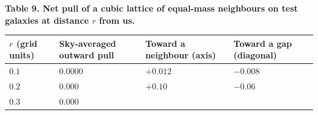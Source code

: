 \documentclass[
  11pt,
]{article}
\begin{document}
\textbf{Table 9. Net pull of a cubic lattice of equal-mass neighbours on
test galaxies at distance \(r\) from us.}

\begin{longtable}[]{@{}llll@{}}
\toprule
\begin{minipage}[b]{0.22\columnwidth}\raggedright
\(r\) (grid units)\strut
\end{minipage} & \begin{minipage}[b]{0.22\columnwidth}\raggedright
Sky-averaged outward pull\strut
\end{minipage} & \begin{minipage}[b]{0.22\columnwidth}\raggedright
Toward a neighbour (axis)\strut
\end{minipage} & \begin{minipage}[b]{0.22\columnwidth}\raggedright
Toward a gap (diagonal)\strut
\end{minipage}\tabularnewline
\midrule
\endhead
\begin{minipage}[t]{0.22\columnwidth}\raggedright
\(0.1\)\strut
\end{minipage} & \begin{minipage}[t]{0.22\columnwidth}\raggedright
\(0.0000\)\strut
\end{minipage} & \begin{minipage}[t]{0.22\columnwidth}\raggedright
\(+0.012\)\strut
\end{minipage} & \begin{minipage}[t]{0.22\columnwidth}\raggedright
\(-0.008\)\strut
\end{minipage}\tabularnewline
\begin{minipage}[t]{0.22\columnwidth}\raggedright
\(0.2\)\strut
\end{minipage} & \begin{minipage}[t]{0.22\columnwidth}\raggedright
\(0.000\)\strut
\end{minipage} & \begin{minipage}[t]{0.22\columnwidth}\raggedright
\(+0.10\)\strut
\end{minipage} & \begin{minipage}[t]{0.22\columnwidth}\raggedright
\(-0.06\)\strut
\end{minipage}\tabularnewline
\begin{minipage}[t]{0.22\columnwidth}\raggedright
\(0.3\)\strut
\end{minipage} & \begin{minipage}[t]{0.22\columnwidth}\raggedright
\(0.000\)\strut
\end{minipage} & \begin{minipage}[t]{0.22\columnwidth}\raggedright

\end{minipage}
\end{longtable}
\end{document}
